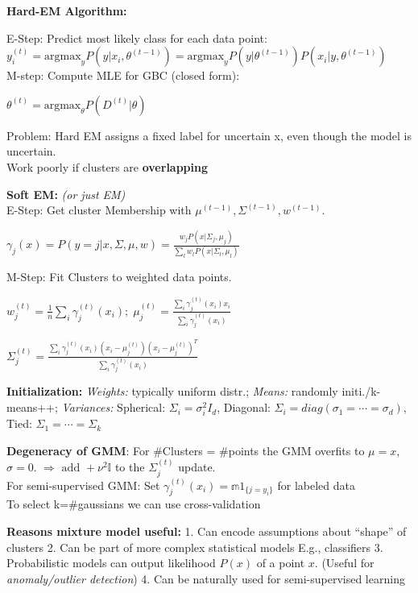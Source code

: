     \textbf{Hard-EM Algorithm:}
    
    E-Step: Predict most likely class for each data point:\\
    $y_i^{(t)}=\mathrm{argmax}_yP(y|x_i,\theta^{(t-1)})=\mathrm{argmax}_y P(y|\theta^{(t-1)}) P(x_i|y,\theta^{(t-1)})$\\
    M-step: Compute MLE for GBC (closed form):\\
    \centerline{$\theta^{(t)}= \mathrm{argmax}_\theta P(D^{(t)}|\theta)$}
    Problem: Hard EM assigns a fixed label for uncertain x, even though the model is uncertain.\\
    Work poorly if clusters are \textbf{overlapping}
    
    \textbf{Soft EM:} \textit{\small(or just EM)}\\
    E-Step: Get cluster Membership with $\scriptstyle\mu^{(t-1)},\Sigma^{(t-1)},w^{(t-1)}$.\\
    \centerline{$\gamma_j(x) = P(y = j| x,\Sigma,\mu,w)= \frac{w_jP(x|\Sigma_j,\mu_j)}{\sum_l w_l P(x|\Sigma_l,\mu_l)}$}
    M-Step: Fit Clusters to weighted data points.\\
    \centerline{$w_j^{(t)}= \frac{1}{n}\sum_i\gamma_j^{(t)}(x_i);\;\mu_j^{(t)} = \frac{\sum_i\gamma_j^{(t)}(x_i)x_i}{\sum_i\gamma_j^{(t)}(x_i)}$}
    \centerline{$\Sigma_j^{(t)}= \frac{\sum_i\gamma_j^{(t)}(x_i)(x_i-\mu_j^{(t)})(x_i-\mu_j^{(t)})^T}{\sum_i \gamma_j^{(t)}(x_i)}$}

    \textbf{Initialization:} \textit{Weights:} typically uniform distr.; \textit{Means:} randomly initi./k-means++; \textit{Variances:} Spherical: $\Sigma_i = \sigma_i^2 I_d$, Diagonal: $\Sigma_i = diag(\sigma_1 = \cdots = \sigma_d)$, Tied: $\Sigma_1 = \cdots = \Sigma_k$
    
    \textbf{Degeneracy of GMM}: For \#Clusters = \#points the GMM overfits to $\mu=x$, $\sigma=0$. $\Rightarrow \text{ add } +\nu^2\mathbb{I}$ to the $\Sigma_j^{(t)}$ update.\\
    For semi-supervised GMM: Set $\gamma_j^{(t)}(x_i)= \mathbb m{1}_{\{j=y_i\}}$ for labeled data\\
    To select k=\#gaussians we can use cross-validation

    \textbf{Reasons mixture model useful:} 
    1. Can encode assumptions about “shape” of clusters 
    2. Can be part of more complex statistical models E.g., classifiers
    3. Probabilistic models can output likelihood $P(x)$ of a point $x$. (Useful for \textit{anomaly/outlier detection})
    4. Can be naturally used for semi-supervised learning
    
